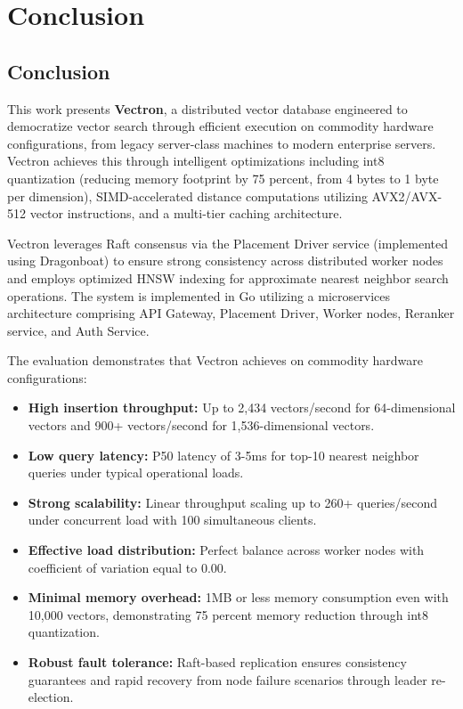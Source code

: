 \chapter{Conclusion}

\section{Conclusion}

This work presents \textbf{Vectron}, a distributed vector database engineered to democratize vector search through efficient execution on commodity hardware configurations, from legacy server-class machines to modern enterprise servers. Vectron achieves this through intelligent optimizations including int8 quantization (reducing memory footprint by 75 percent, from 4 bytes to 1 byte per dimension), SIMD-accelerated distance computations utilizing AVX2/AVX-512 vector instructions, and a multi-tier caching architecture.

Vectron leverages Raft consensus via the Placement Driver service (implemented using Dragonboat) to ensure strong consistency across distributed worker nodes and employs optimized HNSW indexing for approximate nearest neighbor search operations. The system is implemented in Go utilizing a microservices architecture comprising API Gateway, Placement Driver, Worker nodes, Reranker service, and Auth Service.

The evaluation demonstrates that Vectron achieves on commodity hardware configurations:

\begin{itemize}
    \item \textbf{High insertion throughput:} Up to 2,434 vectors/second for 64-dimensional vectors and 900+ vectors/second for 1,536-dimensional vectors.
    \item \textbf{Low query latency:} P50 latency of 3-5ms for top-10 nearest neighbor queries under typical operational loads.
    \item \textbf{Strong scalability:} Linear throughput scaling up to 260+ queries/second under concurrent load with 100 simultaneous clients.
    \item \textbf{Effective load distribution:} Perfect balance across worker nodes with coefficient of variation equal to 0.00.
    \item \textbf{Minimal memory overhead:} 1MB or less memory consumption even with 10,000 vectors, demonstrating 75 percent memory reduction through int8 quantization.
    \item \textbf{Robust fault tolerance:} Raft-based replication ensures consistency guarantees and rapid recovery from node failure scenarios through leader re-election.
\end{itemize}

